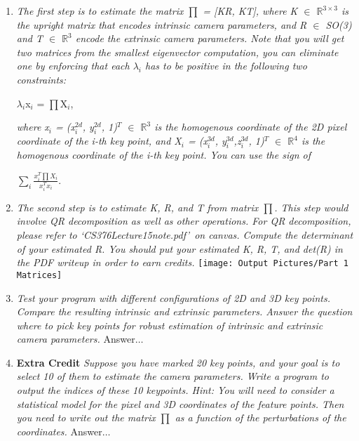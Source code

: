 \documentclass[11pt]{article}
\begin{document}
\begin{enumerate}
        \item \textit{The first step is to estimate the matrix $\prod$ = [KR, KT], where K $\in$
            $\mathbb{R}^{3\times3}$ is the upright matrix that encodes intrinsic camera parameters, and R $\in$ SO(3)
            and T $\in$ $\mathbb{R}^{3}$ encode the extrinsic camera parameters. Note that you will get two matrices
            from the smallest eigenvector computation, you can eliminate one by enforcing that each $\lambda_i$ has
            to be positive in the following two constraints:}
        \begin{center}
            $\lambda_i$x$_i$ = $\prod$X$_i$,
        \end{center}
        \textit{where x$_i$ = (x$_i^{2d}$, y$_i^{2d}$, 1)$^T$ $\in$ $\mathbb{R}^{3}$ is the homogenous coordinate of
        the 2D pixel coordinate of the i-th key point, and X$_i$ = (x$_i^{3d}$, y$_i^{3d}$,z$_i^{3d}$, 1)$^T$ $\in$
            $\mathbb{R}^{4}$ is the homogenous coordinate of the i-th key point. You can use the sign of }
        \begin{center}
            $\sum_{i}\frac{x_{i}^{T}\prod X_{i}}{x_{i}^{T}x_{i}}$.
        \end{center}

        \item \textit{The second step is to estimate K, R, and T from matrix $\prod$. This step would involve QR
        decomposition as well as other operations. For QR decomposition, please refer to
        \textquoteleft CS376Lecture15note.pdf\textquoteright\ on canvas. Compute the determinant of your estimated R.
        You should put your estimated K, R, T, and det(R) in the PDF writeup in order to earn credits.}\newline
        \texttt{[image: Output Pictures/Part 1 Matrices]}\newline

        \item \textit{Test your program with different configurations of 2D and 3D key points. Compare the resulting
        intrinsic and extrinsic parameters. Answer the question where to pick key points for robust estimation of
        intrinsic and extrinsic camera parameters.}\newline
        Answer$\ldots$\newline

        \item \textbf{Extra Credit} \textit{Suppose you have marked 20 key points, and your goal is to select 10 of
        them to estimate the camera parameters. Write a program to output the indices of these 10 keypoints. Hint:
        You will need to consider a statistical model for the pixel and 3D coordinates of the feature points. Then
        you need to write out the matrix $\prod$ as a function of the perturbations of the coordinates.}\newline
        Answer$\ldots$\newline


\end{enumerate}
\end{document}
